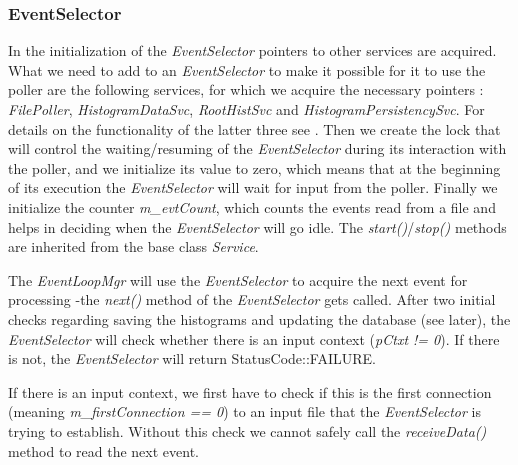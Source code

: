 \subsubsection{\textbf{EventSelector}}
In the initialization of the \textit{EventSelector} pointers to other services are acquired. What we need to add to an \textit{EventSelector} to make it possible for it to use the poller are the following services, for which we acquire the necessary pointers : \textit{FilePoller}, \textit{HistogramDataSvc}, \textit{RootHistSvc} and \textit{HistogramPersistencySvc}. For details on the functionality of the latter three see \cite{mato1998gaudi}. Then we create the lock that will control the waiting/resuming of the \textit{EventSelector} during its interaction with the poller, and we initialize its value to zero, which means that at the beginning of its execution the \textit{EventSelector} will wait for input from the poller. Finally we initialize the counter \textit{m\_evtCount}, which counts the events read from a file and helps in deciding when the \textit{EventSelector} will go idle.
The \textit{start()}/\textit{stop()} methods are inherited from the base class \textit{Service}.\par
The \textit{EventLoopMgr} will use the \textit{EventSelector} to acquire the next event for processing -the \textit{next()} method of the \textit{EventSelector} gets called. After two initial checks regarding saving the histograms and updating the database (see later), the \textit{EventSelector} will check whether there is an input context (\textit{pCtxt != 0}).
If there is not, the \textit{EventSelector} will return StatusCode::FAILURE.\par
If there is an input context, we first have to check if this is the first connection (meaning \textit{m\_firstConnection == 0}) to an input file that the \textit{EventSelector} is trying to establish. Without this check we cannot safely call the \textit{receiveData()} method to read the next event.\par

